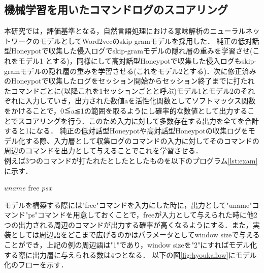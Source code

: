 \subsection{機械学習を用いたコマンドログのスコアリング}
\label{eval:impl}
本研究では，評価基準となる，自然言語処理における意味解析のニューラルネットワークのモデルとしてWord2vecのskip-gramモデルを採用した．
純正の低対話型Honeypotで収集した侵入ログでskip-gramモデルの隠れ層の重みを学習させ(これをモデル1
とする)，同様にして高対話型Honeypotで収集した侵入ログもskip-gramモデルの隠れ層の重みを学習させる(これをモデル2とする)．次に修正済みのHoneypotで収集したログをセッション開始からセッション終了までに打たれたコマンドごとに(以降これを1セッションごとと呼ぶ)モデル1とモデル2のそれぞれに入力していき，出力された数値aを活性化関数としてソフトマックス関数をかけることで，0≦a≦1の範囲を取るようにし確率的な数値として出力することでスコアリングを行う．このため入力に対して多数存在する出力を全てを合計すると1になる．
純正の低対話型Honeypotや高対話型Honeypotの収集ログをモデル化する際、入力層として収集ログのコマンドの入力に対してそのコマンドの周辺のコマンドを出力として与えることでこれを学習させる．\\
例えば3つのコマンドが打たれたとしたとしたものを以下のプログラム\ref{lst:exam}に示す．

\vspace{5mm}
\begin{mylisting}[label=exam,language=sh,caption=3つの実行コマンドの例]
 $ uname
 $ free
 $ ps x
 $
\end{mylisting}
\vspace{5mm}

モデルを構築する際には"free"コマンドを入力にした時に，出力として"uname"コマンド"ps"コマンドを用意しておくことで，freeが入力として与えられた時に他2つの出力される周辺のコマンドが出力する確率が高くなるようにする．また，実装としては周辺語をどこまで広げるのかはパラメータとしてwindow sizeで与えることができ，上記の例の周辺語は"1"であり，window sizeを"2"にすればモデル化する際に出力層に与えられる数は4つとなる．
以下の図\ref{fig:hyoukaflow}にモデル化のフローを示す．\\

